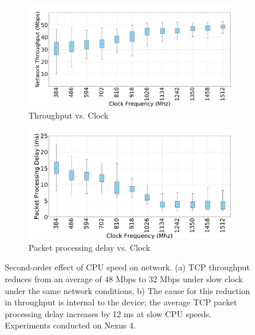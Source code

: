 \begin{figure}
    \begin{subfigure}[b]{0.5\textwidth}
        \centering
        \includegraphics[height=0.5\textwidth,width=1\textwidth]{sections/device-work/Throughput}
        \caption{Throughput vs. Clock}
    \end{subfigure}
    \begin{subfigure}[b]{0.5\textwidth}
        \centering
        \includegraphics[height=0.5\textwidth,width=1\textwidth]{sections/device-work/ppd}
        \caption{Packet processing delay vs. Clock}
    \end{subfigure}%
     \caption{Second-order effect of CPU speed on network. (a) TCP throughput reduces from an average of 48 Mbps to 32 Mbps under slow clock under the same network conditions, b) The cause for this reduction in throughput is internal to the device; the average TCP packet processing delay increases by 12 ms at slow CPU speeds. Experiments conducted on Nexus 4.}
     \label{fig:tcp-perf}
     \vspace*{-1em}
\end{figure}


